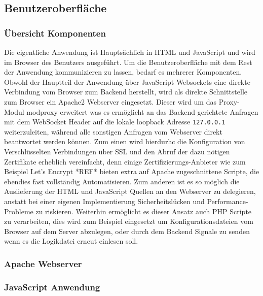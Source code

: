 \subsection{Benutzeroberfläche}
\subsubsection{Übersicht Komponenten}
Die eigentliche Anwendung ist Hauptsächlich in HTML und JavaScript und wird im Browser des Benutzers ausgeführt. Um die Benutzeroberfläche mit dem Rest der Anwendung kommunizieren zu lassen, bedarf es mehrerer Komponenten. Obwohl der Hauptteil der Anwendung über JavaScript Websockets eine direkte Verbindung vom Browser zum Backend herstellt, wird als direkte Schnittstelle zum Browser ein Apache2 Webserver eingesetzt. Dieser wird um das Proxy-Modul modproxy erweitert was es ermöglicht an das Backend gerichtete Anfragen mit dem WebSocket Header auf die lokale loopback Adresse \texttt{127.0.0.1} weiterzuleiten, während alle sonstigen Anfragen vom Webserver direkt beantwortet werden können. Zum einen wird hierdurhc die Konfiguration von Verschlüsselten Verbindungen über SSL und den Abruf der dazu nötigen Zertifikate erheblich vereinfacht, denn einige Zertifizierungs-Anbieter wie zum Beispiel Let's Encrypt *REF* bieten extra auf Apache zugeschnittene Scripte, die ebendies fast vollständig Automatisieren. Zum anderen ist es so möglich die Auslieferung der HTML und JavaScript Quellen an den Webserver zu delegieren, anstatt bei einer eigenen Implementierung Sicherheitslücken und Performance-Probleme zu riskieren. Weiterhin ermöglicht es dieser Ansatz auch PHP Scripte zu verarbeiten, dies wird zum Beispiel eingesetzt um Konfigurationsdateien vom Browser auf dem Server abzulegen, oder durch dem Backend Signale zu senden wenn es die Logikdatei erneut einlesen soll.
\subsubsection{Apache Webserver}
\subsubsection{JavaScript Anwendung}
